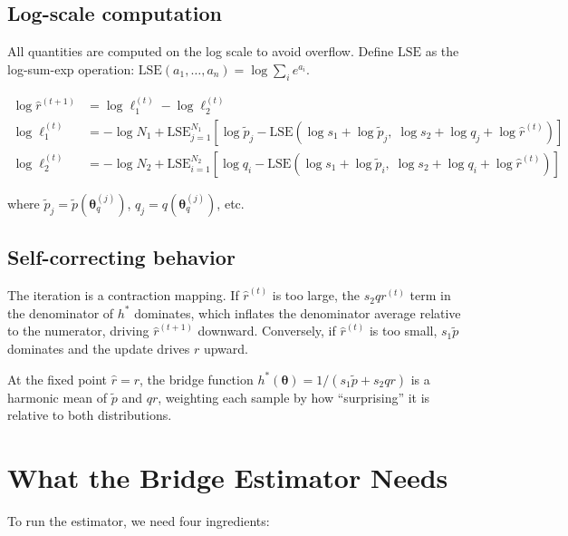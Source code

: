 \documentclass[11pt]{article}
\newcommand{\bth}{\boldsymbol{\theta}}
\newcommand{\ptilde}{\tilde{p}}
\theoremstyle{plain}
\theoremstyle{definition}
\begin{document}
\subsection{Log-scale computation}

All quantities are computed on the log scale to avoid overflow. Define
$\text{LSE}$ as the log-sum-exp operation:
$\text{LSE}(a_1, \ldots, a_n) = \log \sum_i e^{a_i}$.

\begin{align}
  \log \hat{r}^{(t+1)} &= \log \ell_1^{(t)} - \log \ell_2^{(t)} \\
  \log \ell_1^{(t)} &= -\log N_1 + \text{LSE}_{j=1}^{N_1}\!\left[
    \log \ptilde_j - \text{LSE}\!\left(
      \log s_1 + \log \ptilde_j,\;
      \log s_2 + \log q_j + \log \hat{r}^{(t)}
    \right)
  \right] \label{eq:log_num} \\
  \log \ell_2^{(t)} &= -\log N_2 + \text{LSE}_{i=1}^{N_2}\!\left[
    \log q_i - \text{LSE}\!\left(
      \log s_1 + \log \ptilde_i,\;
      \log s_2 + \log q_i + \log \hat{r}^{(t)}
    \right)
  \right] \label{eq:log_den}
\end{align}

where $\ptilde_j = \ptilde(\bth^{(j)}_q)$, $q_j = q(\bth^{(j)}_q)$, etc.


\subsection{Self-correcting behavior}

The iteration is a contraction mapping. If $\hat{r}^{(t)}$ is too large,
the $s_2 q r^{(t)}$ term in the denominator of $h^*$ dominates, which
inflates the denominator average relative to the numerator, driving
$\hat{r}^{(t+1)}$ downward. Conversely, if $\hat{r}^{(t)}$ is too small,
$s_1 \ptilde$ dominates and the update drives $r$ upward.

At the fixed point $\hat{r} = r$, the bridge function
$h^*(\bth) = 1/(s_1 \ptilde + s_2 q r)$ is a harmonic mean of $\ptilde$
and $qr$, weighting each sample by how ``surprising'' it is relative to both
distributions.


\section{What the Bridge Estimator Needs}

To run the estimator, we need four ingredients:
\end{document}
